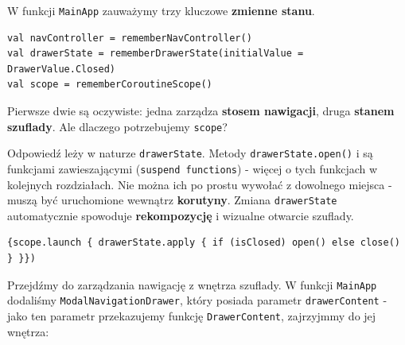 W funkcji \texttt{MainApp} zauważymy trzy kluczowe \textbf{zmienne stanu}.

\begin{verbatim}
val navController = rememberNavController()
val drawerState = rememberDrawerState(initialValue = DrawerValue.Closed)
val scope = rememberCoroutineScope()
\end{verbatim}

Pierwsze dwie są oczywiste: jedna zarządza \textbf{stosem nawigacji}, druga \textbf{stanem szuflady}. Ale dlaczego potrzebujemy \texttt{scope}?

Odpowiedź leży w naturze \texttt{drawerState}. Metody \texttt{drawerState.open()} i  są funkcjami zawieszającymi (\texttt{suspend functions}) - więcej o tych funkcjach w kolejnych rozdziałach. Nie można ich po prostu wywołać z dowolnego miejsca - muszą być uruchomione wewnątrz \textbf{korutyny}. Zmiana \texttt{drawerState} automatycznie spowoduje \textbf{rekompozycję} i wizualne otwarcie szuflady.

\begin{verbatim}
{scope.launch { drawerState.apply { if (isClosed) open() else close() } }})
\end{verbatim}

Przejdźmy do zarządzania nawigację z wnętrza szuflady. W funkcji \texttt{MainApp} dodaliśmy \texttt{ModalNavigationDrawer}, który posiada parametr \texttt{drawerContent} - jako ten parametr przekazujemy funkcję \texttt{DrawerContent}, zajrzyjmmy do jej wnętrza:

